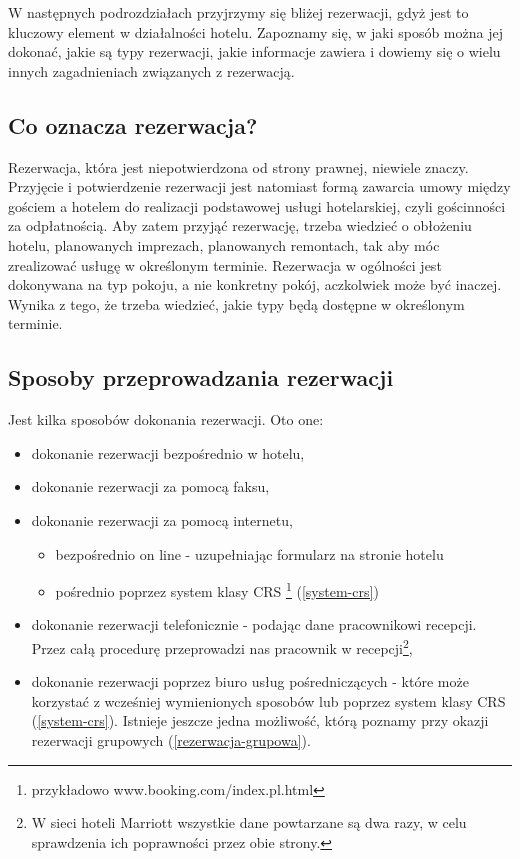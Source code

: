 \documentclass[a4paper,onecolumn,oneside,11pt,wide,floatssmall]{mwrep}
\theoremstyle{definition}
\theoremstyle{plain}%
\theoremstyle{remark}
\begin{document}
W następnych podrozdziałach przyjrzymy się bliżej rezerwacji, gdyż jest to 
kluczowy element w działalności hotelu. Zapoznamy się, w jaki sposób można jej dokonać, jakie są 
typy rezerwacji, jakie informacje zawiera i dowiemy się o wielu innych 
zagadnieniach związanych z rezerwacją.

\subsection{Co oznacza rezerwacja?}
Rezerwacja, która jest niepotwierdzona od strony prawnej, niewiele znaczy. 
Przyjęcie i potwierdzenie rezerwacji jest natomiast formą zawarcia umowy 
między gościem a hotelem do realizacji podstawowej usługi hotelarskiej, 
czyli gościnności za odpłatnością. Aby zatem przyjąć rezerwację, trzeba 
wiedzieć o obłożeniu hotelu, planowanych imprezach, planowanych remontach, 
tak aby móc zrealizować usługę w określonym terminie. Rezerwacja w ogólności 
jest dokonywana na typ pokoju, a nie konkretny pokój, aczkolwiek może być 
inaczej. Wynika z tego, że trzeba wiedzieć, jakie typy będą dostępne w 
określonym terminie.

\subsection{Sposoby przeprowadzania rezerwacji}
Jest kilka sposobów dokonania rezerwacji. Oto one:
\begin{itemize}
  \item dokonanie rezerwacji bezpośrednio w hotelu,
  \item dokonanie rezerwacji za pomocą faksu,
  \item dokonanie rezerwacji za pomocą internetu,
  \begin{itemize}
     \item bezpośrednio on line - uzupełniając formularz na 
     stronie hotelu
     \item pośrednio poprzez system klasy CRS \footnote{przykładowo 
     www.booking.com/index.pl.html} (\ref{system-crs})
  \end{itemize}
  \item dokonanie rezerwacji telefonicznie - podając dane 
  pracownikowi recepcji. Przez całą procedurę przeprowadzi nas pracownik w 
  recepcji\footnote{W sieci hoteli Marriott wszystkie dane powtarzane są 
  dwa razy, w celu sprawdzenia ich poprawności przez obie strony.},
  \item dokonanie rezerwacji poprzez biuro usług pośredniczących - które  
  może korzystać z wcześniej wymienionych sposobów lub poprzez system klasy 
  CRS (\ref{system-crs}). Istnieje jeszcze jedna możliwość, którą poznamy przy 
  okazji rezerwacji grupowych (\ref{rezerwacja-grupowa}).
\end{itemize}
\end{document}
